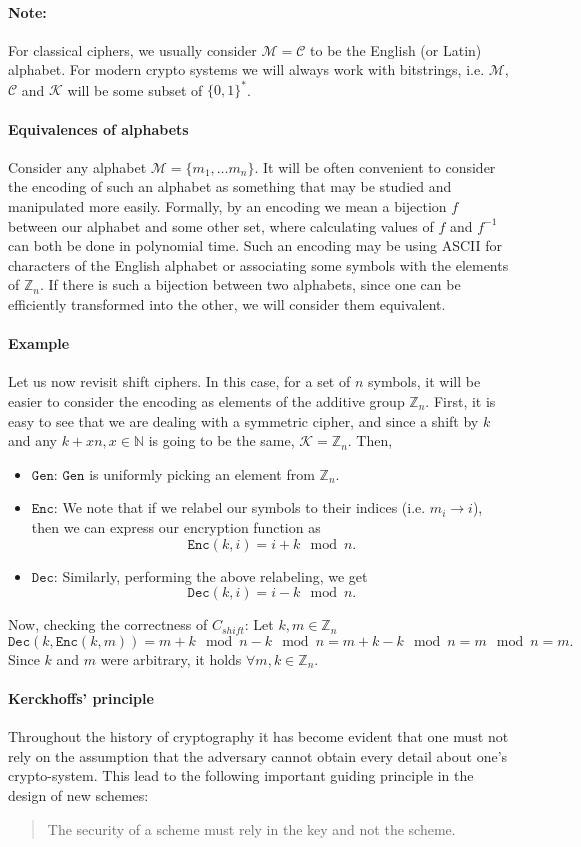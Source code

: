 \documentclass{article}
\theoremstyle{definition}
\newcommand{\Enc}{\texttt{Enc}}
\newcommand{\Dec}{\texttt{Dec}}
\newcommand{\Gen}{\texttt{Gen}}
\renewcommand{\C}{\mathcal{C}}
\newcommand{\M}{\mathcal{M}}
\newcommand{\C}{\mathcal{C}}
\newcommand{\K}{\mathcal{K}}
\newcommand{\Int}{\mathbb{Z}}
\begin{document}
\paragraph{Note:} For classical ciphers, we usually consider $\M = \C$ to be the
English (or Latin) alphabet. For modern crypto systems we will always work with
bitstrings, i.e. $\M$, $\C$ and $\K$ will be some subset of $\{0, 1\}^*$.
\paragraph{Equivalences of alphabets}
Consider any alphabet $\M = \{m_1, \hdots m_n\}$. It will be 
often convenient to consider the encoding of such an alphabet as something that
may be studied and manipulated more easily. Formally, by an encoding we mean a
bijection $f$ between our alphabet and some other set, where calculating values
of $f$ and $f^{-1}$ can both be done in polynomial time. Such an encoding may
be using ASCII for characters of the English alphabet or associating some
symbols with the elements of $\Int_n$. If there is such a bijection between
two alphabets, since one can be efficiently transformed into the other, we will
consider them equivalent.

\paragraph{Example}
Let us now revisit shift ciphers. In this case, for a set of $n$ symbols, it
will be easier to consider the encoding as elements of the additive group
$\Int_n$. First, it is easy to see that we are dealing with a
symmetric cipher, and since a shift by $k$ and any $k + xn, x \in \mathbb{N}$ is
going to be the same, $\K = \Int_n$. Then,
\begin{itemize}
\item $\Gen$: $\Gen$ is uniformly picking an element from $\Int_n$.
\item $\Enc$: We note that if we relabel our symbols to their
  indices (i.e. $m_i \to i$), then we can express our encryption function as
  \[
    \Enc(k, i) = i + k \mod n.
  \]
\item $\Dec$: Similarly, performing the above relabeling, we get
  \[
    \Dec(k, i) = i - k \mod n.
  \]
\end{itemize}
Now, checking the correctness of $C_{shift}$: Let $k, m \in \Int_n$
\[
  \Dec(k, \Enc(k, m)) = m + k \mod n - k \mod n = m + k - k \mod n = m \mod n = m.
\]
Since $k$ and $m$ were arbitrary, it holds $\forall m, k \in \Int_n$.
\paragraph{Kerckhoffs' principle}
Throughout the history of cryptography it has become evident that one must not
rely on the assumption that the adversary cannot obtain every detail about one's
crypto-system. This lead to the following important guiding principle in the
design of new schemes:
\begin{quotation}
The security of a scheme must rely in the key and not the scheme.
\end{quotation}
\end{document}
